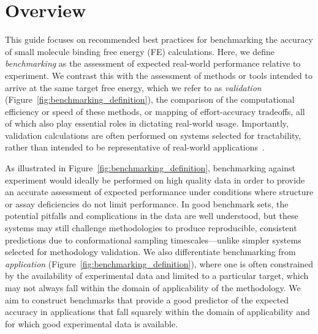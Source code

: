 \documentclass[9pt,bestpractices]{livecoms}
\begin{document}

\section{Overview}

This guide focuses on recommended best practices for benchmarking the accuracy of small molecule binding free energy (FE) calculations. 
Here, we define \emph{benchmarking} as the assessment of expected real-world performance relative to experiment.
We contrast this with the assessment of methods or tools intended to arrive at the same target free energy, which we refer to as \emph{validation} (Figure~\ref{fig:benchmarking_definition}), the comparison of the computational efficiency or speed of these methods, or mapping of effort-accuracy tradeoffs, all of which also play essential roles in dictating real-world usage.
Importantly, validation calculations are often performed on systems selected for tractability, rather than intended to be representative of real-world applications~\cite{mobleyPredictingBindingFree2017,vangunsteren_validation_2018,tsai_validation_2020}. 


%

As illustrated in Figure~\ref{fig:benchmarking_definition}, benchmarking against experiment would ideally be performed on high quality data in order to provide an accurate assessment of expected performance under conditions where structure or assay deficiencies do not limit performance. 
In good benchmark sets, the potential pitfalls and complications in the data are well understood, but these systems may still challenge methodologies to produce reproducible, consistent predictions due to conformational sampling timescales---unlike simpler systems selected for methodology validation.
We also differentiate benchmarking from \emph{application} (Figure~\ref{fig:benchmarking_definition}), where one is often constrained by the availability of experimental data and limited to a particular target, which may not always fall within the domain of applicability of the methodology. 
We aim to construct benchmarks that provide a good predictor of the expected accuracy in applications that fall squarely within the domain of applicability and for which good experimental data is available.
\end{document}
